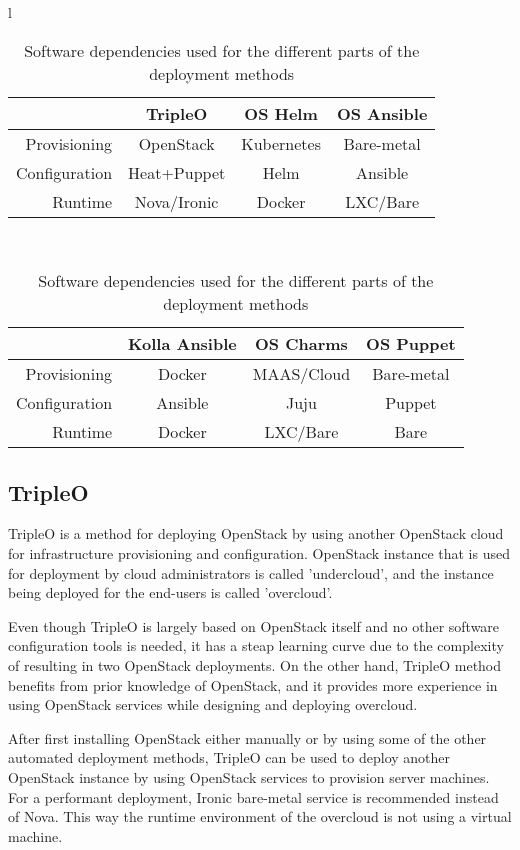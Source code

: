 \begin{table}[t]
\centering
\begin{tabular}{ l }
\begin{tabular} {r | c c c } \\
              & TripleO     & OS Helm     & OS Ansible  \\
\hline
Provisioning  & OpenStack   & Kubernetes  & Bare-metal  \\
Configuration & Heat+Puppet & Helm        & Ansible     \\
Runtime       & Nova/Ironic & Docker      & LXC/Bare    \\
\end{tabular} \\
\begin{tabular} {r | c c c } \\
              & Kolla Ansible & OS Charms   & OS Puppet \\
\hline
Provisioning  & Docker        & MAAS/Cloud  & Bare-metal\\
Configuration & Ansible       & Juju        & Puppet    \\
Runtime       & Docker        & LXC/Bare    & Bare      \\
\end{tabular}
\end{tabular}
\caption{Software dependencies used for the different parts of the deployment
         methods}
\label{tab:dependencies}
\end{table}

\subsection{TripleO}

TripleO \cite{tripleo} is a method for deploying OpenStack by using another
OpenStack cloud for infrastructure provisioning and configuration. OpenStack
instance that is used for deployment by cloud administrators is called
'undercloud', and the instance being deployed for the end-users is called
'overcloud'.

Even though TripleO is largely based on OpenStack itself and no other software
configuration tools is needed, it has a steap learning curve due to the
complexity of resulting in two OpenStack deployments. On the other hand,
TripleO method benefits from prior knowledge of OpenStack, and it provides more
experience in using OpenStack services while designing and deploying overcloud.

After first installing OpenStack either manually or by using some of the other
automated deployment methods, TripleO can be used to deploy another OpenStack
instance by using OpenStack services to provision server machines. For a
performant deployment, Ironic bare-metal service is recommended instead of
Nova. This way the runtime environment of the overcloud is not using a virtual
machine.

